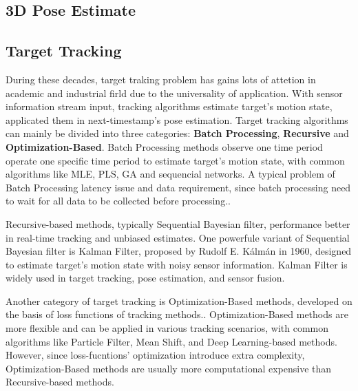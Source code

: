 \subsection {3D Pose Estimate}

\subsection{Target Tracking}
During these decades, target traking problem has gains lots of attetion in academic and industrial firld due to the universality of application. With sensor information stream input, tracking algorithms estimate target's motion state, applicated them in next-timestamp's pose estimation. Target tracking algorithms can mainly be divided into three categories: \textbf{Batch Processing}, \textbf{Recursive} and \textbf{Optimization-Based}\cite{KumarMondal2021}. Batch Processing methods observe one time period operate one specific time period to estimate target's motion state, with common algorithms like MLE, PLS, GA and sequencial networks. A typical problem of Batch Processing latency issue and data requirement, since batch processing need to wait for all data to be collected before processing.\cite{KumarMondal2021}. 

Recursive-based methods, typically Sequential Bayesian filter, performance better in real-time tracking and unbiased estimates\cite{KumarMondal2021}. One powerfule variant of Sequential Bayesian filter is Kalman Filter, proposed by Rudolf E. Kálmán in 1960\cite{Kalman1960}, designed to estimate target's motion state with noisy sensor information. Kalman Filter is widely used in target tracking, pose estimation, and sensor fusion. 

Another category of target tracking is Optimization-Based methods, developed on the basis of loss functions of tracking methods.\cite{KumarMondal2021}. Optimization-Based methods are more flexible and can be applied in various tracking scenarios, with common algorithms like Particle Filter, Mean Shift, and Deep Learning-based methods. However, since loss-fucntions' optimization introduce extra complexity, Optimization-Based methods are usually more computational expensive than Recursive-based methods.
\nocite{Khabarlak_2022}


